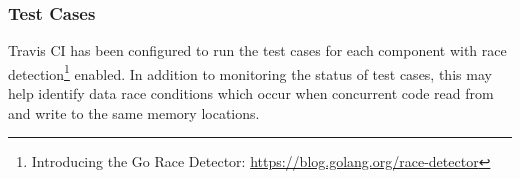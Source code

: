 
\subsubsection{Test Cases}

Travis CI has been configured to run the test cases for each component with race detection\footnote{Introducing the Go Race Detector: \url{https://blog.golang.org/race-detector}} enabled. In addition to monitoring the status of test cases, this may help identify data race conditions which occur when concurrent code read from and write to the same memory locations.
